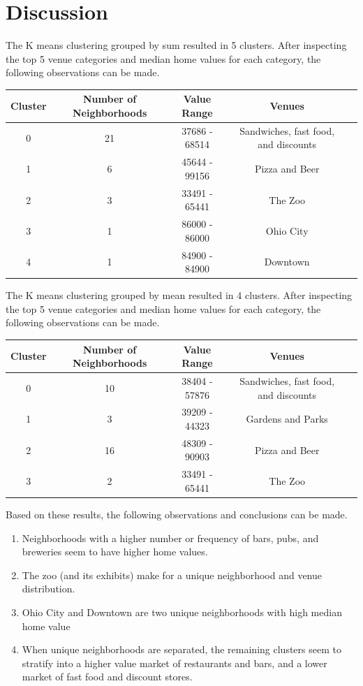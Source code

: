 \documentclass[twoside,14pt]{report}
\begin{document}
\chapter*{Discussion}

The K means clustering grouped by sum resulted in 5 clusters.  After inspecting the top 5 venue categories and median home values for each category, the following observations can be made.

\begin{center}
\begin{tabular}{c|c|c|c|l}
Cluster & Number of Neighborhoods & Value Range&Venues\\ \hline
0 & 21 & 37686 - 68514& Sandwiches, fast food, and discounts\\
1 & 6 & 45644 - 99156 & Pizza and Beer \\
2 & 3 & 33491 - 65441 & The Zoo\\
3 & 1 & 86000 - 86000 & Ohio City \\
4&1&84900 - 84900 & Downtown\\
\end{tabular}
\end{center}

The K means clustering grouped by mean resulted in 4 clusters.  After inspecting the top 5 venue categories and median home values for each category, the following observations can be made.

\begin{center}
\begin{tabular}{c|c|c|c|l}
Cluster & Number of Neighborhoods & Value Range&Venues\\ \hline
0 & 10 & 38404 - 57876&Sandwiches, fast food, and discounts\\
1 & 3 & 39209 - 44323 & Gardens and Parks \\
2 & 16 & 48309 - 90903 & Pizza and Beer \\
3 & 2 & 33491 - 65441 & The Zoo\\
\end{tabular}
\end{center}

Based on these results, the following observations and conclusions can be made.

\begin{enumerate}
    \item Neighborhoods with a higher number or frequency of bars, pubs, and breweries seem to have higher home values.
    \item The zoo (and its exhibits) make for a unique neighborhood and venue distribution.
    \item Ohio City and Downtown are two unique neighborhoods with high median home value
    \item When unique neighborhoods are separated, the remaining clusters seem to stratify into a higher value market of restaurants and bars, and a lower market of fast food and discount stores. 
\end{enumerate}
\end{document}
